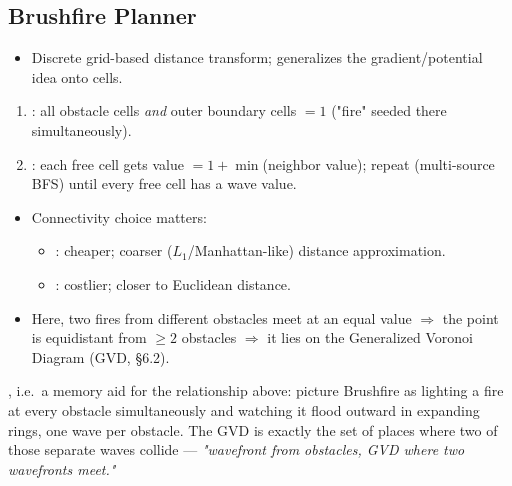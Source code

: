 \subsection{Brushfire Planner}
\begin{itemize}
\item Discrete grid-based distance transform; generalizes the gradient/potential idea onto cells.
\end{itemize}
\begin{enumerate}
\item {}: all obstacle cells \emph{and} outer boundary cells $=1$ ("fire" seeded there simultaneously).
\item {}: each free cell gets value $=1+\min$(neighbor value); repeat (multi-source BFS) until every free cell has a wave value.
\end{enumerate}
\begin{itemize}
\item Connectivity choice matters:
  \begin{itemize}
  \item {}: cheaper; coarser ($L_1$/Manhattan-like) distance approximation.
  \item {}: costlier; closer to Euclidean distance.
  \end{itemize}
\item Here, two fires from different obstacles meet at an equal value $\Rightarrow$ the point is equidistant from $\ge2$ obstacles $\Rightarrow$ it lies on the Generalized Voronoi Diagram (GVD, \S6.2).
\end{itemize}
\begin{notebox}
, i.e.\ a memory aid for the relationship above: picture Brushfire as lighting a fire at every obstacle simultaneously and watching it flood outward in expanding rings, one wave per obstacle. The GVD is exactly the set of places where two of those separate waves collide --- \emph{"wavefront from obstacles, GVD where two wavefronts meet."}
\end{notebox}
\begin{democallout}
\end{democallout}

